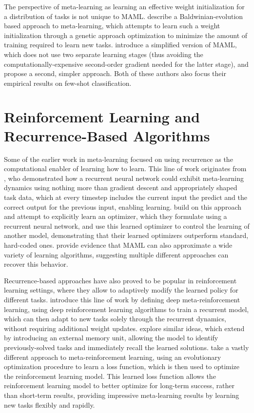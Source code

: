 The perspective of meta-learning as learning an effective weight initialization for a distribution of tasks is not unique to MAML. \textcite{Fernando2018} describe a Baldwinian-evolution based approach to meta-learning, which attempts to learn such a weight initialization through a genetic approach optimization to minimize the amount of training required to learn new tasks. \textcite{Nichol} introduce a simplified version of MAML, which does not use two separate learning stages (thus avoiding the computationally-expensive second-order gradient needed for the latter stage), and propose a second, simpler approach. Both of these authors also focus their empirical results on few-shot classification.

\section{Reinforcement Learning and Recurrence-Based Algorithms}
Some of the earlier work in meta-learning focused on using recurrence as the computational enabler of learning how to learn. This line of work originates from \textcite{Hochreiter2001}, who demonstrated how a recurrent neural network could exhibit meta-learning dynamics using nothing more than gradient descent and appropriately shaped task data, which at every timestep includes the current input the predict and the correct output for the previous input, enabling learning. \textcite{Andrychowicz2016} build on this approach and attempt to explicitly learn an optimizer, which they formulate using a recurrent neural network, and use this learned optimizer to control the learning of another model, demonstrating that their learned optimizers outperform standard, hard-coded ones. \textcite{Finn2018} provide evidence that MAML can also approximate a wide variety of learning algorithms, suggesting multiple different approaches can recover this behavior.

Recurrence-based approaches have also proved to be popular in reinforcement learning settings, where they allow to adaptively modify the learned policy for different tasks. \textcite{Wang2016} introduce this line of work by defining deep meta-reinforcement learning, using deep reinforcement learning algorithms to train a recurrent model, which can then adapt to new tasks solely through the recurrent dynamics, without requiring additional weight updates. \textcite{Duan2017} explore similar ideas, which \textcite{Ritter2018,Ritter2018a} extend by introducing an external memory unit, allowing the model to identify previously-solved tasks and immediately recall the learned solutions. \textcite{Houthooft2018} take a vastly different approach to meta-reinforcement learning, using an evolutionary optimization procedure to learn a loss function, which is then used to optimize the reinforcement learning model. This learned loss function allows the reinforcement learning model to better optimize for long-term success, rather than short-term results, providing impressive meta-learning results by learning new tasks flexibly and rapidly.

